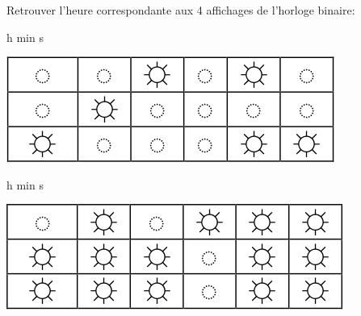\documentclass{article}
\begin{document}
Retrouver l’heure correspondante aux 4 affichages de l’horloge binaire:

\vspace{2em}

\begin{minipage}[b]{.3\linewidth}
	\begin{Form}
		\begin{center}
			\TextField[name=bbc1h,width=2em]{}h \TextField[name=bbc1m,width=2em]{}min \TextField[name=bbc1s,width=2em]{}s
			\vspace{2em}
		\end{center}
	\end{Form}
\end{minipage}
\hfill
\begin{minipage}[b]{.6\linewidth}
	\centering
	\includegraphics[width=.7\linewidth]{./figures/bbc1.png}
\end{minipage}

\vspace{2em}

\begin{minipage}[b]{.3\linewidth}
	\begin{Form}
		\begin{center}
			\TextField[name=bbc2h,width=2em]{}h \TextField[name=bbc2m,width=2em]{}min \TextField[name=bbc2s,width=2em]{}s
			\vspace{2em}
		\end{center}
	\end{Form}
\end{minipage}
\hfill
\begin{minipage}[b]{.6\linewidth}
	\centering
	\includegraphics[width=.7\linewidth]{./figures/bbc2.png}
\end{minipage}

\vspace{2em}
\end{document}
